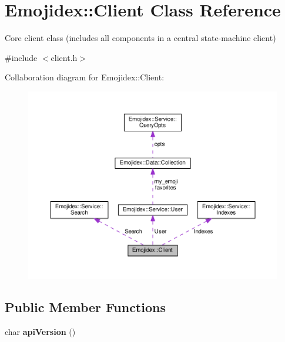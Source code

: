 \hypertarget{classEmojidex_1_1Client}{}\section{Emojidex\+:\+:Client Class Reference}
\label{classEmojidex_1_1Client}


Core client class (includes all components in a central state-\/machine client)  




{\ttfamily \#include $<$client.\+h$>$}



Collaboration diagram for Emojidex\+:\+:Client\+:\nopagebreak
\begin{figure}[H]
\begin{center}
\leavevmode
\includegraphics[width=350pt]{classEmojidex_1_1Client__coll__graph}
\end{center}
\end{figure}
\subsection*{Public Member Functions}
\begin{DoxyCompactItemize}
\item 
char {\bfseries api\+Version} ()\hypertarget{classEmojidex_1_1Client_ada04f1b9d696a792184798e9021c4d1c}{}\label{classEmojidex_1_1Client_ada04f1b9d696a792184798e9021c4d1c}

\end{DoxyCompactItemize}
